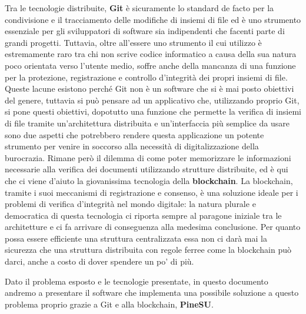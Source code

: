 Tra le tecnologie distribuite, \textbf{Git} è sicuramente lo standard de facto per la condivisione
e il tracciamento delle modifiche di insiemi di file ed è uno strumento essenziale per
gli sviluppatori di software sia indipendenti che facenti parte di grandi progetti.
Tuttavia, oltre all'essere uno strumento il cui utilizzo è estremamente raro tra chi
non scrive codice informatico a causa della sua natura poco orientata verso l'utente medio,
soffre anche della mancanza di una funzione per la protezione, registrazione e controllo
d'integrità dei propri insiemi di file. Queste lacune esistono perché Git non è un software
che si è mai posto obiettivi del genere, tuttavia si può pensare ad un applicativo che,
utilizzando proprio Git, si pone questi obiettivi, dopotutto una funzione che permette
la verifica di insiemi di file tramite un'architettura distribuita e un'interfaccia più
semplice da usare sono due aspetti che potrebbero rendere questa applicazione un potente
strumento per venire in soccorso alla necessità di digitalizzazione della burocrazia.
Rimane però il dilemma di come poter memorizzare le informazioni necessarie alla verifica 
dei documenti utilizzando strutture distribuite, ed è qui che ci viene d'aiuto la giovanissima 
tecnologia della \textbf{blockchain}.
La blockchain, tramite i suoi meccanismi di registrazione e consenso, è una soluzione ideale
per i problemi di verifica d'integrità nel mondo digitale: la natura plurale e democratica
di questa tecnologia ci riporta sempre al paragone iniziale tra le architetture e ci
fa arrivare di conseguenza alla medesima conclusione. Per quanto possa essere efficiente
una struttura centralizzata essa non ci darà mai la sicurezza che una struttura distribuita
con regole ferree come la blockchain può darci, anche a costo di dover spendere un po' di più.


Dato il problema esposto e le tecnologie presentate, in questo documento andremo a
presentare il software che implementa una possibile soluzione a questo problema
proprio grazie a Git e alla blockchain, \textbf{PineSU}.

